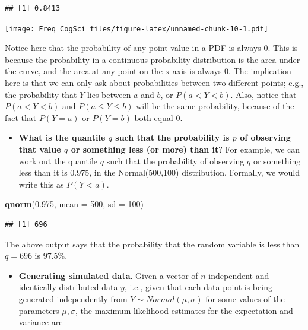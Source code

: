 \documentclass[12pt,]{krantz}
\newenvironment{Shaded}{\begin{snugshade}}{\end{snugshade}}
\newcommand{\DataTypeTok}[1]{\textcolor[rgb]{0.13,0.29,0.53}{#1}}
\newcommand{\DecValTok}[1]{\textcolor[rgb]{0.00,0.00,0.81}{#1}}
\newcommand{\FloatTok}[1]{\textcolor[rgb]{0.00,0.00,0.81}{#1}}
\newcommand{\KeywordTok}[1]{\textcolor[rgb]{0.13,0.29,0.53}{\textbf{#1}}}
\newcommand{\NormalTok}[1]{#1}
\providecommand{\tightlist}{%
  \setlength{\itemsep}{0pt}\setlength{\parskip}{0pt}}
\begin{document}
\begin{verbatim}
## [1] 0.8413
\end{verbatim}

\texttt{[image: Freq\_CogSci\_files/figure-latex/unnamed-chunk-10-1.pdf]}

Notice here that the probability of any point value in a PDF is always 0. This is because the probability in a continuous probability distribution is the area under the curve, and the area at any point on the x-axis is always 0. The implication here is that we can only ask about probabilities between two different points; e.g., the probability that \(Y\) lies between \(a\) and \(b\), or \(P(a<Y<b)\). Also, notice that \(P(a<Y<b)\) and \(P(a\leq Y\leq b)\) will be the same probability, because of the fact that \(P(Y=a)\) or \(P(Y=b)\) both equal 0.

\begin{itemize}
\tightlist
\item
  \textbf{What is the quantile \(q\) such that the probability is \(p\) of observing that value \(q\) or something less (or more) than it}? For example, we can work out the quantile \(q\) such that the probability of observing \(q\) or something less than it is 0.975, in the Normal(500,100) distribution. Formally, we would write this as \(P(Y<a)\).
\end{itemize}

\begin{Shaded}
\begin{Highlighting}[]
\KeywordTok{qnorm}\NormalTok{(}\FloatTok{0.975}\NormalTok{, }\DataTypeTok{mean =} \DecValTok{500}\NormalTok{, }\DataTypeTok{sd =} \DecValTok{100}\NormalTok{)}
\end{Highlighting}
\end{Shaded}

\begin{verbatim}
## [1] 696
\end{verbatim}

The above output says that the probability that the random variable is less than \(q=696\) is 97.5\%.

\begin{itemize}
\tightlist
\item
  \textbf{Generating simulated data}. Given a vector of \(n\) independent and identically distributed data \(y\), i.e., given that each data point is being generated independently from \(Y \sim Normal(\mu,\sigma)\) for some values of the parameters \(\mu,\sigma\), the maximum likelihood estimates for the expectation and variance are
\end{itemize}
\end{document}
